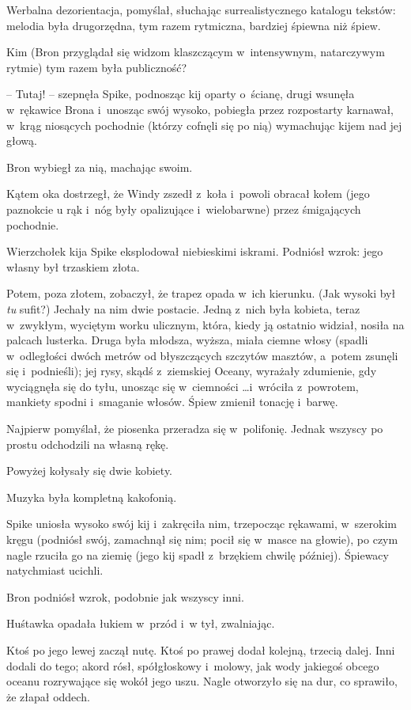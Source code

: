 \documentclass[oneside,polish,11pt,rmheadings]{mwbk}
\begin{document}
Werbalna dezorientacja, pomyślał, słuchając surrealistycznego katalogu tekstów: melodia była drugorzędna, tym razem rytmiczna, bardziej śpiewna niż śpiew. 

Kim (Bron przyglądał się widzom klaszczącym w~intensywnym, natarczywym rytmie) tym razem była publiczność?  

-- Tutaj! -- szepnęła Spike, podnosząc kij oparty o~ścianę, drugi wsunęła w~rękawice Brona i~unosząc swój wysoko, pobiegła przez rozpostarty karnawał, w~krąg niosących pochodnie (którzy cofnęli się po nią) wymachując kijem nad jej głową. 

Bron wybiegł za nią, machając swoim. 

Kątem oka dostrzegł, że Windy zszedł z~koła i~powoli obracał kołem (jego paznokcie u rąk i~nóg były opalizujące i~wielobarwne) przez śmigających pochodnie. 

Wierzchołek kija Spike eksplodował niebieskimi iskrami. Podniósł wzrok: jego własny był trzaskiem złota. 

Potem, poza złotem, zobaczył, że trapez opada w~ich kierunku. (Jak wysoki był \textit{tu }sufit?) Jechały na nim dwie postacie. Jedną z~nich była kobieta, teraz w~zwykłym, wyciętym worku ulicznym, która,  kiedy ją ostatnio widział, nosiła na palcach lusterka. Druga była młodsza, wyższa, miała ciemne włosy (spadli w~odległości dwóch metrów od błyszczących szczytów masztów, a~potem zsunęli się i~podnieśli); jej rysy, skądś z~ziemskiej Oceany, wyrażały zdumienie, gdy wyciągnęła się do tyłu, unosząc się w~ciemności  \ldots i~wróciła z~powrotem, mankiety spodni i~smaganie włosów. Śpiew zmienił tonację i~barwę. 

Najpierw pomyślał, że piosenka przeradza się w~polifonię. Jednak wszyscy po prostu odchodzili na własną rękę. 

Powyżej kołysały się dwie kobiety. 

Muzyka była kompletną kakofonią. 

Spike uniosła wysoko swój kij i~zakręciła nim, trzepocząc rękawami, w~szerokim kręgu (podniósł swój, zamachnął się nim; pocił się w~masce na głowie), po czym nagle rzuciła go na ziemię (jego kij spadł z~brzękiem chwilę później). Śpiewacy natychmiast ucichli. 

Bron podniósł wzrok, podobnie jak wszyscy inni. 

Huśtawka opadała łukiem w~przód i~w tył, zwalniając. 

Ktoś po jego lewej zaczął nutę. Ktoś po prawej dodał kolejną, trzecią dalej. Inni dodali do tego; akord rósł, spółgłoskowy i~molowy, jak wody jakiegoś obcego oceanu rozrywające się wokół jego uszu. Nagle otworzyło się na dur, co sprawiło, że złapał oddech. 
\end{document}
